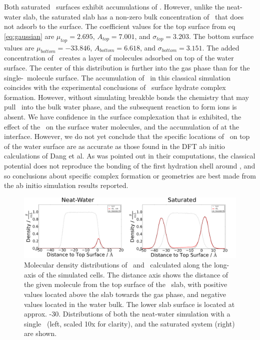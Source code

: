Both saturated \suldiox~surfaces exhibit accumulations of \suldiox. However, unlike the neat-water slab, the saturated slab has a non-zero bulk concentration of \suldiox~that does not adsorb to the surface. The coefficient values for the top surface from eq \ref{eq:gaussian} are $\mu_{top}=2.695$, $A_{top}=7.001$, and $\sigma_{top}=3.203$. The bottom surface values are $\mu_{bottom}=-33.846$, $A_{bottom}=6.618$, and $\sigma_{bottom}=3.151$\angs. The added concentration of \suldiox~creates a layer of molecules adsorbed on top of the water surface. The center of this distribution is further into the gas phase than for the single-\suldiox~molecule surface. The accumulation of \suldiox~in this classical simulation coincides with the experimental conclusions of \suldiox~surface hydrate complex formation. However, without simulating breakble bonds the chemistry that may pull \suldiox~into the bulk water phase, and the subsequent reaction to form ions is absent. We have confidence in the surface complexation that is exhibited, the effect of the \suldiox~on the surface water molecules, and the accumulation of \suldiox at the interface. However, we do not yet conclude that the specific locations of \suldiox~on top of the water surface are as accurate as those found in the DFT ab initio calculations of Dang et al.\cite{Baer2010} As was pointed out in their computations, the classical potential does not reproduce the bonding of the first hydration shell around \suldiox, and so conclusions about specific complex formation or geometries are best made from the ab initio simulation results reported.

\begin{figure}[h!]
	\begin{center}
		\includegraphics[scale=1.0]{images/density/density.png}
		\caption{Molecular density distributions of \wat~and \suldiox~calculated along the long-axis of the simulated cells. The distance axis shows the distance of the given molecule from the top surface of the \wat~slab, with positive values located above the slab towards the gas phase, and negative values located in the water bulk. The lower slab surface is located at approx. -30\angs. Distributions of both the neat-water simulation with a single \suldiox~(left, scaled 10x for clarity), and the saturated system (right) are shown.}
		\label{fig:density}
	\end{center}
\end{figure}
